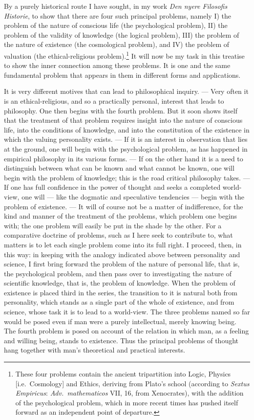 \documentclass[12pt,a4paper]{book}
\newcommand{\opage}[1]{\marginnote{\footnotesize\textit{[#1]}}}
\begin{document}
By a purely historical route I have sought, in my work \textit{Den nyere
Filosofis Historie}, to show that there are four such principal problems, namely
I) the problem of the nature of conscious life (the psychological problem),
II) the problem of the validity of knowledge (the logical problem), III) the
problem of the nature of existence (the cosmological problem), and IV) the
problem of valuation (the ethical-religious problem).\footnote{These four
problems contain the ancient tripartition into Logic, Physics [i.e.\ Cosmology]
and Ethics, deriving from Plato's school (according to \textit{Sextus
Empiricus}: \textit{Adv.\ mathematicos} VII, 16, from Xenocrates), with the
addition of the psychological problem, which in more recent times has pushed
itself forward as an independent point of departure.} It will now be my task in
this treatise to show the inner connection among these problems. It is one and
the same fundamental problem that appears in them in different forms and
applications.

It is very different motives that can lead to philosophical inquiry. --- Very
often it is an ethical-religious, and so a practically personal, interest that
leads to philosophy. One then begins with the fourth problem. But it soon shows
itself that the treatment of that problem requires insight into the nature of
conscious life, into the conditions of knowledge, and into the constitution of
the existence in which the valuing personality exists. --- If it is an interest
in observation that lies at the ground, one will begin with the psychological
problem, as has happened in empirical philosophy in its various forms. --- If on
the other hand it is a need to distinguish between what can be known and what
cannot be known, one will begin with the problem of knowledge; this is the road
critical philosophy takes. --- If one has full confidence in the power of
thought and seeks a completed world-view, one will --- like the dogmatic and
speculative tendencies --- begin with the problem of existence. --- It will of
course not be a matter of indifference, for the kind and manner of the treatment
of the problems, which problem one begins with; the one problem will easily be
put in the shade by the other. For a comparative doctrine of problems, such as I
here seek to contribute to, what matters is to let each single problem come into
its full right. I proceed, then, in this way: in keeping with the analogy
indicated above between personality and science, I first bring forward \opage{4}the
problem of the nature of personal life, that is, the psychological problem, and
then pass over to investigating the nature of scientific knowledge, that is, the
problem of knowledge. When the problem of existence is placed third in the
series, the transition to it is natural both from personality, which stands as a
single part of the whole of existence, and from science, whose task it is to
lead to a world-view. The three problems named so far would be posed even if man
were a purely intellectual, merely knowing being. The fourth problem is posed on
account of the relation in which man, as a feeling and willing being, stands to
existence. Thus the principal problems of thought hang together with man's
theoretical and practical interests.
\end{document}
